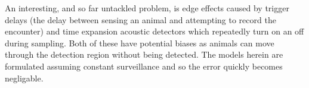 \documentclass[a4paper,10pt,reqno,oneside]{amsart}
\begin{document}
An interesting, and so far untackled problem, is edge effects caused by trigger delays (the delay between sensing an animal and attempting to record the encounter) and time expansion acoustic detectors which repeatedly turn on an off during sampling. Both of these have potential biases as animals can move through the detection region without being detected. The models herein are formulated assuming constant surveillance and so the error quickly becomes negligable.

	
	
\end{document}
